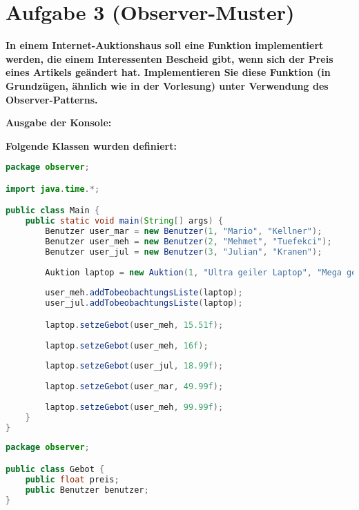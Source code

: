 \section{Aufgabe 3 (Observer-Muster)}

\textbf{In einem Internet-Auktionshaus soll eine Funktion implementiert werden, die einem
Interessenten Bescheid gibt, wenn sich der Preis eines Artikels geändert hat. Implementieren
Sie diese Funktion (in Grundzügen, ähnlich wie in der Vorlesung) unter Verwendung des
Observer-Patterns.}

\textbf{Ausgabe der Konsole:}


\textbf{Folgende Klassen wurden definiert:}
\begin{lstlisting}[language=java, style=java, caption={Main.java},
label={lst:lst3}]
package observer;

import java.time.*;

public class Main {
	public static void main(String[] args) {
		Benutzer user_mar = new Benutzer(1, "Mario", "Kellner");
		Benutzer user_meh = new Benutzer(2, "Mehmet", "Tuefekci");
		Benutzer user_jul = new Benutzer(3, "Julian", "Kranen");
		
		Auktion laptop = new Auktion(1, "Ultra geiler Laptop", "Mega geiler Laptop mit Pentium 4 Prozessor", LocalDateTime.of(2017, Month.JULY, 05, 12, 30));
		
		user_meh.addTobeobachtungsListe(laptop);
		user_jul.addTobeobachtungsListe(laptop);

		laptop.setzeGebot(user_meh, 15.51f);
		
		laptop.setzeGebot(user_meh, 16f);
		
		laptop.setzeGebot(user_jul, 18.99f);
		
		laptop.setzeGebot(user_mar, 49.99f);
		
		laptop.setzeGebot(user_meh, 99.99f);	
	}
}
\end{lstlisting}

\begin{lstlisting}[language=java, style=java, caption={Gebot.java},
label={lst:lst4}]
package observer;

public class Gebot {
	public float preis;
	public Benutzer benutzer;
}
\end{lstlisting}

